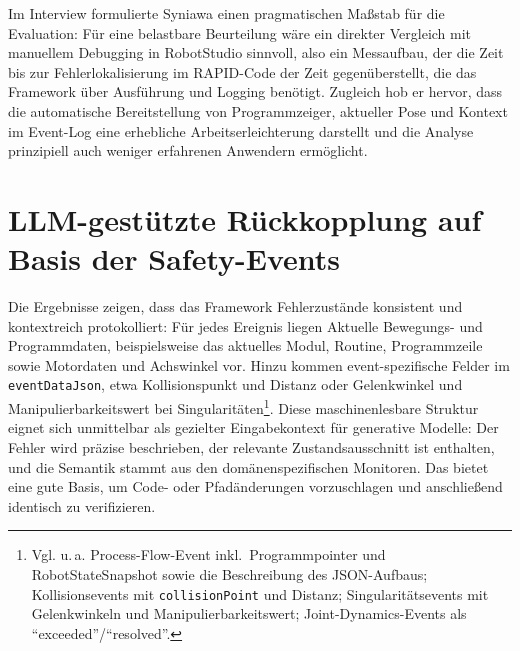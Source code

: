 Im Interview formulierte Syniawa einen pragmatischen Maßstab für die Evaluation:
Für eine belastbare Beurteilung wäre ein direkter Vergleich mit manuellem
Debugging in RobotStudio sinnvoll, also ein Messaufbau, der die Zeit bis zur
Fehlerlokalisierung im RAPID-Code der Zeit gegenüberstellt, die das Framework
über Ausführung und Logging benötigt. Zugleich hob er hervor, dass die
automatische Bereitstellung von Programmzeiger, aktueller Pose und Kontext im
Event-Log eine erhebliche Arbeitserleichterung darstellt und die Analyse
prinzipiell auch weniger erfahrenen Anwendern ermöglicht.

\section{LLM-gestützte Rückkopplung auf Basis der Safety-Events}

Die Ergebnisse zeigen, dass das Framework Fehlerzustände konsistent
und kontextreich protokolliert: Für jedes Ereignis liegen
Aktuelle Bewegungs- und Programmdaten, beispielsweise das aktuelles
Modul, Routine,
Programmzeile sowie Motordaten und Achswinkel vor. Hinzu kommen
event-spezifische Felder im \texttt{eventDataJson}, etwa
Kollisionspunkt und Distanz oder Gelenkwinkel und
Manipulierbarkeitswert bei Singularitäten\footnote{Vgl. u.\,a.
  Process-Flow-Event inkl.\ Programmpointer und RobotStateSnapshot
  sowie die Beschreibung des JSON-Aufbaus; Kollisionsevents mit
  \texttt{collisionPoint} und Distanz; Singularitätsevents mit
  Gelenkwinkeln und Manipulierbarkeitswert; Joint-Dynamics-Events als
\enquote{exceeded}/\enquote{resolved}.}. Diese maschinenlesbare
Struktur eignet sich unmittelbar als gezielter Eingabekontext für
generative Modelle: Der Fehler wird präzise beschrieben, der
relevante Zustandsausschnitt ist enthalten, und die Semantik stammt
aus den domänenspezifischen Monitoren. Das bietet eine gute Basis, um Code-
oder Pfadänderungen vorzuschlagen und anschließend identisch zu
verifizieren.

